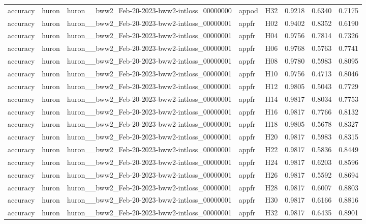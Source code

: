 \begin{table}[tbp]
\begin{tabular}{lllllrrr}
accuracy & huron & huron\_\_bww2\_Feb-20-2023-bww2-intloss\_00000000 & appod & H32 & 0.9218 & 0.6340 & 0.7175 \\
accuracy & huron & huron\_\_bww2\_Feb-20-2023-bww2-intloss\_00000001 & appfr & H02 & 0.9402 & 0.8352 & 0.6190 \\
accuracy & huron & huron\_\_bww2\_Feb-20-2023-bww2-intloss\_00000001 & appfr & H04 & 0.9756 & 0.7814 & 0.7326 \\
accuracy & huron & huron\_\_bww2\_Feb-20-2023-bww2-intloss\_00000001 & appfr & H06 & 0.9768 & 0.5763 & 0.7741 \\
accuracy & huron & huron\_\_bww2\_Feb-20-2023-bww2-intloss\_00000001 & appfr & H08 & 0.9780 & 0.5983 & 0.8095 \\
accuracy & huron & huron\_\_bww2\_Feb-20-2023-bww2-intloss\_00000001 & appfr & H10 & 0.9756 & 0.4713 & 0.8046 \\
accuracy & huron & huron\_\_bww2\_Feb-20-2023-bww2-intloss\_00000001 & appfr & H12 & 0.9805 & 0.5043 & 0.7729 \\
accuracy & huron & huron\_\_bww2\_Feb-20-2023-bww2-intloss\_00000001 & appfr & H14 & 0.9817 & 0.8034 & 0.7753 \\
accuracy & huron & huron\_\_bww2\_Feb-20-2023-bww2-intloss\_00000001 & appfr & H16 & 0.9817 & 0.7766 & 0.8132 \\
accuracy & huron & huron\_\_bww2\_Feb-20-2023-bww2-intloss\_00000001 & appfr & H18 & 0.9805 & 0.5678 & 0.8327 \\
accuracy & huron & huron\_\_bww2\_Feb-20-2023-bww2-intloss\_00000001 & appfr & H20 & 0.9817 & 0.5983 & 0.8315 \\
accuracy & huron & huron\_\_bww2\_Feb-20-2023-bww2-intloss\_00000001 & appfr & H22 & 0.9817 & 0.5836 & 0.8449 \\
accuracy & huron & huron\_\_bww2\_Feb-20-2023-bww2-intloss\_00000001 & appfr & H24 & 0.9817 & 0.6203 & 0.8596 \\
accuracy & huron & huron\_\_bww2\_Feb-20-2023-bww2-intloss\_00000001 & appfr & H26 & 0.9817 & 0.5592 & 0.8694 \\
accuracy & huron & huron\_\_bww2\_Feb-20-2023-bww2-intloss\_00000001 & appfr & H28 & 0.9817 & 0.6007 & 0.8803 \\
accuracy & huron & huron\_\_bww2\_Feb-20-2023-bww2-intloss\_00000001 & appfr & H30 & 0.9817 & 0.6166 & 0.8816 \\
accuracy & huron & huron\_\_bww2\_Feb-20-2023-bww2-intloss\_00000001 & appfr & H32 & 0.9817 & 0.6435 & 0.8901 \\

\end{tabular}
\end{table}

